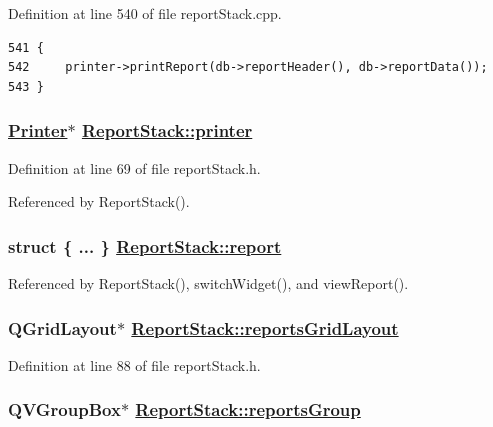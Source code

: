 Definition at line 540 of file report\-Stack.cpp.

\footnotesize\begin{verbatim}541 {
542     printer->printReport(db->reportHeader(), db->reportData());
543 }
\end{verbatim}\normalsize 


\hypertarget{classReportStack_r2}{
\subsubsection[printer]{\setlength{\rightskip}{0pt plus 5cm}\hyperlink{classPrinter}{Printer}$\ast$ \hyperlink{classReportStack_r2}{Report\-Stack::printer}}}
\label{classReportStack_r2}


Definition at line 69 of file report\-Stack.h.

Referenced by Report\-Stack().\hypertarget{classReportStack_r93}{
\subsubsection[report]{\setlength{\rightskip}{0pt plus 5cm}struct \{ ... \}   \hyperlink{classReportStack_r93}{Report\-Stack::report}}}
\label{classReportStack_r93}




Referenced by Report\-Stack(), switch\-Widget(), and view\-Report().\hypertarget{classReportStack_r16}{
\subsubsection[reportsGridLayout]{\setlength{\rightskip}{0pt plus 5cm}QGrid\-Layout$\ast$ \hyperlink{classReportStack_r16}{Report\-Stack::reports\-Grid\-Layout}}}
\label{classReportStack_r16}


Definition at line 88 of file report\-Stack.h.\hypertarget{classReportStack_r14}{
\subsubsection[reportsGroup]{\setlength{\rightskip}{0pt plus 5cm}QVGroup\-Box$\ast$ \hyperlink{classReportStack_r14}{Report\-Stack::reports\-Group}}}
\label{classReportStack_r14}


